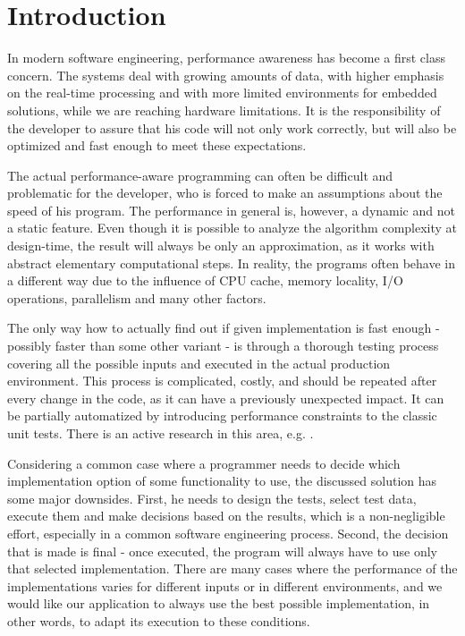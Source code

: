 \chapter*{Introduction}

In modern software engineering, performance awareness has become a first class concern. The systems deal with growing amounts of data, with higher emphasis on the real-time processing and with more limited environments for embedded solutions, while we are reaching hardware limitations. It is the responsibility of the developer to assure that his code will not only work correctly, but will also be optimized and fast enough to meet these expectations.

The actual performance-aware programming can often be difficult and problematic for the developer, who is forced to make an assumptions about the speed of his program. The performance in general is, however, a dynamic and not a static feature. Even though it is possible to analyze the algorithm complexity at design-time, the result will always be only an approximation, as it works with abstract elementary computational steps. In reality, the programs often behave in a different way due to the influence of CPU cache, memory locality, I/O operations, parallelism and many other factors. 

The only way how to actually find out if given implementation is fast enough - possibly faster than some other variant - is through a thorough testing process covering all the possible inputs and executed in the actual production environment. This process is complicated, costly, and should be repeated after every change in the code, as it can have a previously unexpected impact. It can be partially automatized by introducing performance constraints to the classic unit tests. There is an active research in this area, e.g. \cite{bulej_capturing_2012,horky_performance_2013,horky_utilizing_2015}.

Considering a common case where a programmer needs to decide which implementation option of some functionality to use, the discussed solution has some major downsides. First, he needs to design the tests, select test data, execute them and make decisions based on the results, which is a non-negligible effort, especially in a common software engineering process. Second, the decision that is made is final - once executed, the program will always have to use only that selected implementation. There are many cases where the performance of the implementations varies for different inputs or in different environments, and we would like our application to always use the best possible implementation, in other words, to adapt its execution to these conditions.

